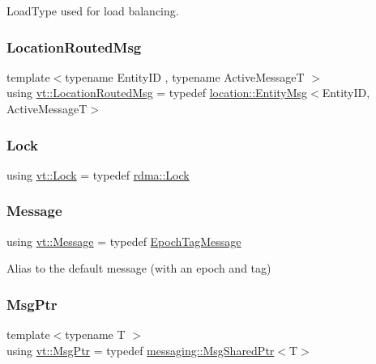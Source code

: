 Load\+Type used for load balancing. 

\mbox{\label{namespacevt_a0cb65f2151629893480ef391def4e733}} 
\subsubsection{\texorpdfstring{Location\+Routed\+Msg}{LocationRoutedMsg}}
{\footnotesize\ttfamily template$<$typename Entity\+ID , typename Active\+MessageT $>$ \\
using \hyperlink{namespacevt_a0cb65f2151629893480ef391def4e733}{vt\+::\+Location\+Routed\+Msg} = typedef \hyperlink{structvt_1_1location_1_1_entity_msg}{location\+::\+Entity\+Msg}$<$Entity\+ID, Active\+MessageT$>$}

\mbox{\label{namespacevt_ae3eb725d1ffe20cd7d82a8c42f3e52ef}} 
\subsubsection{\texorpdfstring{Lock}{Lock}}
{\footnotesize\ttfamily using \hyperlink{namespacevt_1_1rdma_ac5c20b41a653e520b6305d4d454ecb70}{vt\+::\+Lock} = typedef \hyperlink{namespacevt_1_1rdma_ac5c20b41a653e520b6305d4d454ecb70}{rdma\+::\+Lock}}

\mbox{\label{namespacevt_a3a3ddfef40b4c90915fa43cdd5f129ea}} 
\subsubsection{\texorpdfstring{Message}{Message}}
{\footnotesize\ttfamily using \hyperlink{namespacevt_a3a3ddfef40b4c90915fa43cdd5f129ea}{vt\+::\+Message} = typedef \hyperlink{namespacevt_a4ccc13b06bff8a4a35426a1a082a95a9}{Epoch\+Tag\+Message}}



Alias to the default message (with an epoch and tag) 

\mbox{\label{namespacevt_a9f5ebd62ee9d6dd8829e3e1cc4f858e9}} 
\subsubsection{\texorpdfstring{Msg\+Ptr}{MsgPtr}}
{\footnotesize\ttfamily template$<$typename T $>$ \\
using \hyperlink{namespacevt_a9f5ebd62ee9d6dd8829e3e1cc4f858e9}{vt\+::\+Msg\+Ptr} = typedef \hyperlink{structvt_1_1messaging_1_1_msg_shared_ptr}{messaging\+::\+Msg\+Shared\+Ptr}$<$T$>$}




